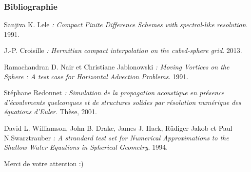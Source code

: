 \documentclass[11pt]{beamer}
\begin{document}

\begin{frame}
\frametitle{Bibliographie}

\begin{thebibliography}{9}
        

\scriptsize{

         Sanjiva K. Lele
         \emph{: Compact Finite Difference Schemes with spectral-like resolution}.
         1991.

         J.-P. Croisille
         \emph{: Hermitian compact interpolation on the cubed-sphere grid}.
         2013.

         Ramachandran D. Nair et Christiane Jablonowski
         \emph{: Moving Vortices on the Sphere : A test case for Horizontal Advection Problems}.
         1991.

         Stéphane Redonnet
         \emph{: Simulation de la propagation acoustique en présence d'écoulements quelconques et de structures solides par résolution numérique des équations d'Euler}.
         Thèse, 2001.
         
         David L. Williamson, John B. Drake, James J. Hack, Rüdiger Jakob et Paul N.Swarztrauber
         \emph{: A strandard test set for Numerical Approximations to the Shallow Water Equations in Spherical Geometry}.
         1994.
    
    }     
         
         
         
\end{thebibliography}
\end{frame}

\begin{frame}
\begin{center}
Merci de votre attention :)
\end{center}
\end{frame}
\end{document}
